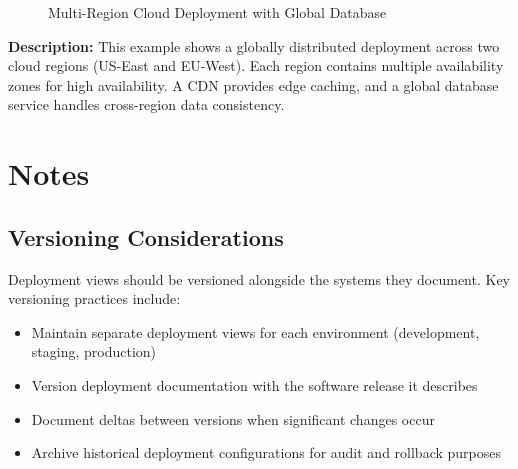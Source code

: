 \documentclass[11pt,letterpaper]{article}
\begin{document}
\begin{figure}[H]
\caption{Multi-Region Cloud Deployment with Global Database}
\end{figure}

\textbf{Description:} This example shows a globally distributed deployment across two cloud regions (US-East and EU-West). Each region contains multiple availability zones for high availability. A CDN provides edge caching, and a global database service handles cross-region data consistency.

\section{Notes}

\subsection{Versioning Considerations}

Deployment views should be versioned alongside the systems they document. Key versioning practices include:

\begin{itemize}
    \item Maintain separate deployment views for each environment (development, staging, production)
    \item Version deployment documentation with the software release it describes
    \item Document deltas between versions when significant changes occur
    \item Archive historical deployment configurations for audit and rollback purposes
\end{itemize}
\end{document}
